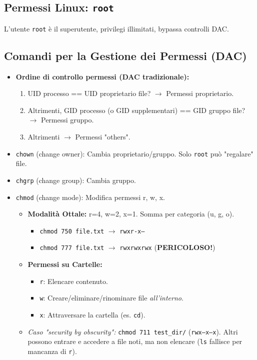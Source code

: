 \documentclass{article}
\begin{document}
\subsection{Permessi Linux: \texttt{root}}
L'utente \texttt{root} è il superutente, privilegi illimitati, bypassa controlli DAC.

\subsection{Comandi per la Gestione dei Permessi (DAC)}
\begin{itemize}
    \item \textbf{Ordine di controllo permessi (DAC tradizionale):}
    \begin{enumerate}
        \item UID processo == UID proprietario file? $\rightarrow$ Permessi proprietario.
        \item Altrimenti, GID processo (o GID supplementari) == GID gruppo file? $\rightarrow$ Permessi gruppo.
        \item Altrimenti $\rightarrow$ Permessi "others".
    \end{enumerate}
    \item \texttt{chown} (change owner): Cambia proprietario/gruppo. Solo \texttt{root} può "regalare" file.
    \item \texttt{chgrp} (change group): Cambia gruppo.
    \item \texttt{chmod} (change mode): Modifica permessi r, w, x.
    \begin{itemize}
        \item \textbf{Modalità Ottale:} r=4, w=2, x=1. Somma per categoria (u, g, o).
        \begin{itemize}
            \item \texttt{chmod 750 file.txt} $\rightarrow$ \texttt{rwxr-x---}
            \item \texttt{chmod 777 file.txt} $\rightarrow$ \texttt{rwxrwxrwx} (\textbf{PERICOLOSO!})
        \end{itemize}
        \item \textbf{Permessi su Cartelle:}
        \begin{itemize}
            \item \texttt{r}: Elencare contenuto.
            \item \texttt{w}: Creare/eliminare/rinominare file \textit{all'interno}.
            \item \texttt{x}: Attraversare la cartella (es. \texttt{cd}).
        \end{itemize}
        \item \textit{Caso "security by obscurity":} \texttt{chmod 711 test\_dir/} (\texttt{rwx--x--x}). Altri possono entrare e accedere a file noti, ma non elencare (\texttt{ls} fallisce per mancanza di \texttt{r}).
    \end{itemize}
\end{itemize}
\end{document}
